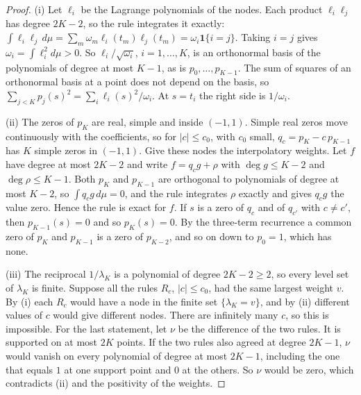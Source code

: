 \begin{proof}
(i) Let $\ell_i$ be the Lagrange polynomials of the nodes. Each product $\ell_i\ell_j$ has degree $2K-2$, so the rule integrates it exactly: $\int\ell_i\ell_j\,d\mu=\sum_m\omega_m\ell_i(t_m)\ell_j(t_m)=\omega_i\mathbf 1\{i=j\}$. Taking $i=j$ gives $\omega_i=\int\ell_i^2d\mu>0$. So $\ell_i/\sqrt{\omega_i}$, $i=1,\ldots,K$, is an orthonormal basis of the polynomials of degree at most $K-1$, as is $p_0,\ldots,p_{K-1}$. The sum of squares of an orthonormal basis at a point does not depend on the basis, so $\sum_{j<K}p_j(s)^2=\sum_i\ell_i(s)^2/\omega_i$. At $s=t_i$ the right side is $1/\omega_i$.

(ii) The zeros of $p_K$ are real, simple and inside $(-1,1)$. Simple real zeros move continuously with the coefficients, so for $|c|\le c_0$, with $c_0$ small, $q_c=p_K-c\,p_{K-1}$ has $K$ simple zeros in $(-1,1)$. Give these nodes the interpolatory weights. Let $f$ have degree at most $2K-2$ and write $f=q_cg+\rho$ with $\deg g\le K-2$ and $\deg\rho\le K-1$. Both $p_K$ and $p_{K-1}$ are orthogonal to polynomials of degree at most $K-2$, so $\int q_cg\,d\mu=0$, and the rule integrates $\rho$ exactly and gives $q_cg$ the value zero. Hence the rule is exact for $f$. If $s$ is a zero of $q_c$ and of $q_{c'}$ with $c\ne c'$, then $p_{K-1}(s)=0$ and so $p_K(s)=0$. By the three-term recurrence a common zero of $p_K$ and $p_{K-1}$ is a zero of $p_{K-2}$, and so on down to $p_0=1$, which has none.

(iii) The reciprocal $1/\lambda_K$ is a polynomial of degree $2K-2\ge2$, so every level set of $\lambda_K$ is finite. Suppose all the rules $R_c$, $|c|\le c_0$, had the same largest weight $v$. By (i) each $R_c$ would have a node in the finite set $\{\lambda_K=v\}$, and by (ii) different values of $c$ would give different nodes. There are infinitely many $c$, so this is impossible. For the last statement, let $\nu$ be the difference of the two rules. It is supported on at most $2K$ points. If the two rules also agreed at degree $2K-1$, $\nu$ would vanish on every polynomial of degree at most $2K-1$, including the one that equals $1$ at one support point and $0$ at the others. So $\nu$ would be zero, which contradicts (ii) and the positivity of the weights.
\end{proof}

